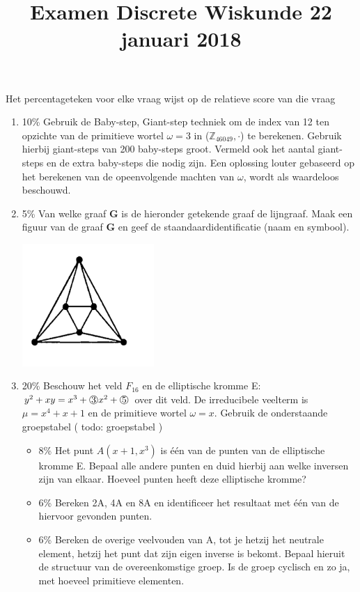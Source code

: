 \documentclass{article}
\def\warning#1{\color{red} #1 \color{black}}
\def\note#1{\color{cyan} #1 \color{black}}
\def\circled#1{\raisebox{.5pt}{\textcircled{\raisebox{-.9pt} {#1}}}}
\begin{document}
\title{Examen Discrete Wiskunde 22 januari 2018}
\date{}
\author{}
\maketitle

\note{Het percentageteken voor elke vraag wijst op de relatieve score van die vraag}

\begin{enumerate}
\item {\note{10\%} Gebruik de Baby-step, Giant-step techniek om de index van 12 ten opzichte van de primitieve wortel $\omega = 3$ in ($\mathbb{Z}_{46049}, \cdot$) te berekenen. Gebruik hierbij giant-steps van 200 baby-steps groot. Vermeld ook het aantal giant-steps en de extra baby-steps die nodig zijn. Een oplossing louter gebaseerd op het berekenen van de opeenvolgende machten van $\omega$, wordt als waardeloos beschouwd.}
\item {\note{5\%} Van welke graaf {\bf G} is de hieronder getekende graaf de lijngraaf. Maak een figuur van de graaf {\bf G} en geef de staandaardidentificatie (naam en symbool).

    \includegraphics[width=5cm]{lijngraaf}}

\item {\note{20\%} Beschouw het veld $F_{16}$ en de elliptische kromme E: $y^2+xy = x^3 + \circled{3}x^2 + \circled{5} $ over dit veld. De irreducibele veelterm is $\mu = x^4 + x + 1$ en de primitieve wortel $\omega = x$. Gebruik de onderstaande groepstabel (\warning{todo: groepstabel})

    \begin{itemize}
    \item {\note{8\%} Het punt $A(x + 1, x^3)$ is één van de punten van de elliptische kromme E. Bepaal alle andere punten en duid hierbij aan welke inversen zijn van elkaar. Hoeveel punten heeft deze elliptische kromme?}
    \item {\note{6\%} Bereken 2A, 4A en 8A en identificeer het resultaat met één van de hiervoor gevonden punten.}
      \item {\note{6\%} Bereken de overige veelvouden van A, tot je hetzij het neutrale element, hetzij het punt dat zijn eigen inverse is bekomt. Bepaal hieruit de structuur van de overeenkomstige groep. Is de groep cyclisch en zo ja, met hoeveel primitieve elementen.}


\end{itemize}}
\end{enumerate}
\end{document}
